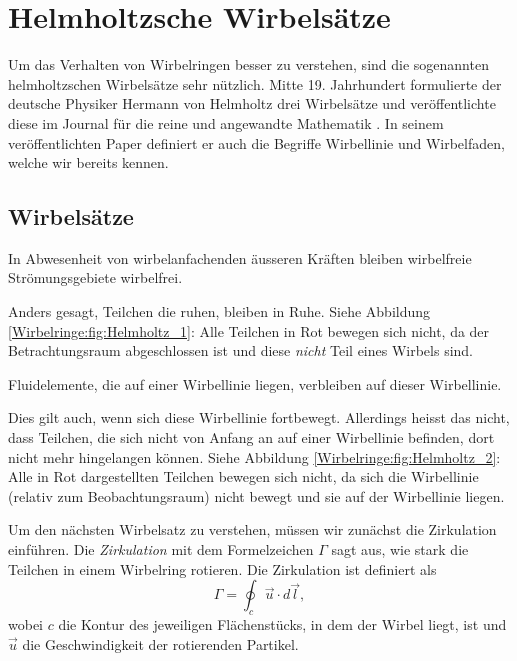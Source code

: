 %
%
%
\section{Helmholtzsche Wirbelsätze}
%
Um das Verhalten von Wirbelringen besser zu verstehen, sind die sogenannten helmholtzschen Wirbelsätze sehr nützlich. 
Mitte 19. Jahrhundert formulierte der deutsche Physiker Hermann von Helmholtz drei Wirbelsätze und veröffentlichte diese im Journal für die reine und angewandte Mathematik \cite{Wirbelringe:JournalHelmholtz}.
%
%
In seinem veröffentlichten Paper definiert er auch die Begriffe Wirbellinie und Wirbelfaden, welche wir bereits kennen.

\subsection{Wirbelsätze}



\begin{satz}
    \label{Wirbelringe:satz:wirbelsatz1}
    In Abwesenheit von wirbelanfachenden äusseren Kräften bleiben wirbelfreie Strömungsgebiete wirbelfrei.
\end{satz}

Anders gesagt, Teilchen die ruhen, bleiben in Ruhe. 
Siehe Abbildung \ref{Wirbelringe:fig:Helmholtz_1}: 
Alle Teilchen in Rot bewegen sich nicht, da der Betrachtungsraum abgeschlossen ist und diese {\em nicht} Teil eines Wirbels sind.

\begin{satz}
    \label{Wirbelringe:satz:wirbelsatz2}
    Fluidelemente, die auf einer Wirbellinie liegen, verbleiben auf dieser Wirbellinie.
\end{satz}

Dies gilt auch, wenn sich diese Wirbellinie fortbewegt.
Allerdings heisst das nicht, dass Teilchen, die sich nicht von Anfang an auf einer Wirbellinie befinden, dort nicht mehr hingelangen können.
Siehe Abbildung \ref{Wirbelringe:fig:Helmholtz_2}:
Alle in Rot dargestellten Teilchen bewegen sich nicht, da sich die Wirbellinie (relativ zum Beobachtungsraum) nicht bewegt und sie auf der Wirbellinie liegen.

Um den nächsten Wirbelsatz zu verstehen, müssen wir zunächst die Zirkulation einführen.
%
Die \emph{Zirkulation} mit dem Formelzeichen \(\Gamma\) sagt aus, wie stark die Teilchen in einem Wirbelring rotieren.
Die Zirkulation ist definiert als 
\begin{equation}
    \label{Wirbelringe:eq:Zirkulation}
    \Gamma
    = 
    \oint_{c} \vec{u} \cdot d \vec{l},
\end{equation}
wobei \(c\) die Kontur des jeweiligen Flächenstücks, in dem der Wirbel liegt, ist und \(\vec{u}\) die Geschwindigkeit der rotierenden Partikel.

